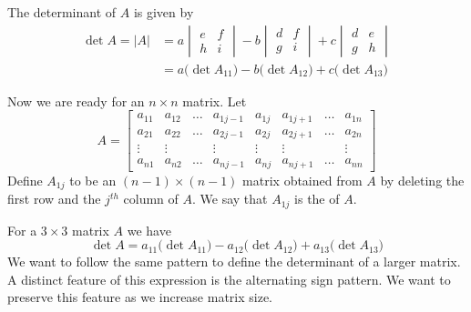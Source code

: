 \documentclass{ximera}
\begin{document}
The determinant of $A$ is given by
\begin{align*}\det{A}=|A|&=a\begin{vmatrix}e&f\\h&i\end{vmatrix}-b\begin{vmatrix}d&f\\g&i\end{vmatrix}+c\begin{vmatrix}d&e\\g&h\end{vmatrix}\\
&=a\big(\det{A_{11}}\big)-b\big(\det{A_{12}}\big)+c\big(\det{A_{13}}\big)
\end{align*}

Now we are ready for an $n\times n$ matrix.  Let 
$$A=\begin{bmatrix}a_{11} & a_{12} & \dots & a_{1j-1} & a_{1j} & a_{1j+1} & \dots & a_{1n}  \\
    a_{21} & a_{22} & \dots & a_{2j-1} & a_{2j} & a_{2j+1} & \dots & a_{2n}  \\
   \vdots & \vdots &  & \vdots & \vdots & \vdots &  & \vdots  \\
   a_{n1} & a_{n2} & \dots & a_{nj-1} & a_{nj} & a_{nj+1} & \dots & a_{nn}\end{bmatrix}$$
   Define $A_{1j}$ to be an $(n-1)\times (n-1)$ matrix obtained from $A$ by deleting the first row and the $j^{th}$ column of $A$.  We say that $A_{1j}$ is the  of $A$.
\begin{center}
 \end{center} 
For a $3\times 3$ matrix $A$ we have
$$\det{A}=a_{11}\big(\det{A_{11}}\big)-a_{12}\big(\det{A_{12}}\big)+a_{13}\big(\det{A_{13}}\big)$$
We want to follow the same pattern  to define the determinant of a larger matrix.  A distinct feature of this expression is the alternating sign pattern.  We want to preserve this feature as we increase matrix size. 
\end{document}
